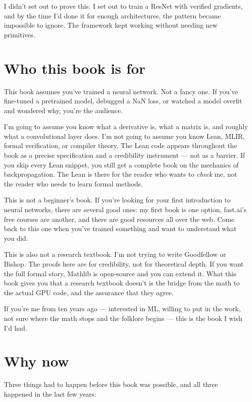 I didn't set out to prove this. I set out to train a ResNet with
verified gradients, and by the time I'd done it for enough architectures,
the pattern became impossible to ignore. The framework kept working
without needing new primitives.

\section*{Who this book is for}

This book assumes you've trained a neural network. Not a fancy one.
If you've fine-tuned a pretrained model, debugged a NaN loss, or
watched a model overfit and wondered why, you're the audience.

I'm going to assume you know what a derivative is, what a matrix is,
and roughly what a convolutional layer does. I'm not going to assume
you know Lean, MLIR, formal verification, or compiler theory. The Lean
code appears throughout the book as a precise specification and a
credibility instrument --- not as a barrier. If you skip every Lean
snippet, you still get a complete book on the mechanics of
backpropagation. The Lean is there for the reader who wants to
\emph{check} me, not the reader who needs to learn formal methods.

This is not a beginner's book. If you're looking for your first
introduction to neural networks, there are several good ones: my
first book is one option, fast.ai's free courses are another, and there
are good resources all over the web. Come back to this one when
you've trained something and want to understand what you did.

This is also not a research textbook. I'm not trying to write Goodfellow
or Bishop. The proofs here are for credibility, not for theoretical depth.
If you want the full formal story, Mathlib is open-source and you can
extend it. What this book gives you that a research textbook doesn't is
the bridge from the math to the actual GPU code, and the assurance
that they agree.

If you're me from ten years ago --- interested in ML, willing to put in
the work, not sure where the math stops and the folklore begins --- this
is the book I wish I'd had.

\section*{Why now}

Three things had to happen before this book was possible, and all three
happened in the last few years:

